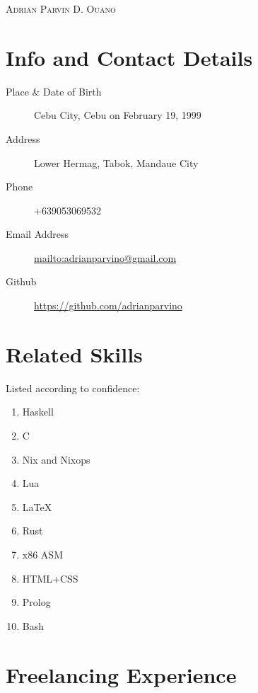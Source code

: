 \documentclass{article}
\author{Adrian Parvin D. Ouano}
\begin{document}



\begin {center}
  \Huge \scshape Adrian Parvin D. Ouano
\end {center}

\hrulefill
\section*{Info and Contact Details}

\begin{description} \item [Place \& Date of Birth] Cebu City, Cebu on February 19, 1999
\item [Address] Lower Hermag, Tabok, Mandaue City
\item [Phone] +639053069532
\item [Email Address] \href{mailto:adrianparvino@gmail.com}{mailto:adrianparvino@gmail.com}
\item [Github] \href{https://github.com/adrianparvino}{https://github.com/adrianparvino}
\end{description}

\hrulefill
\section*{Related Skills}

Listed according to confidence:

\begin{multicols}{2}
\begin {enumerate}
\item Haskell
\item C
\item Nix and Nixops
\item Lua
\item \LaTeX
\item Rust
\item x86 ASM
\item HTML+CSS
\item Prolog
\item Bash
\end {enumerate}
\end{multicols}

\hrulefill
\section*{Freelancing Experience}
\end{document}
